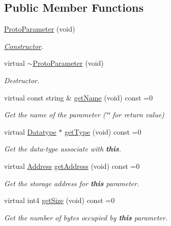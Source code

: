 \subsection*{Public Member Functions}
\begin{DoxyCompactItemize}
\item 
\mbox{\hyperlink{class_proto_parameter_a60a3aefc8f1ddf935990d4c9e6cc1367}{Proto\+Parameter}} (void)
\begin{DoxyCompactList}\small\item\em \mbox{\hyperlink{class_constructor}{Constructor}}. \end{DoxyCompactList}\item 
virtual \mbox{\hyperlink{class_proto_parameter_a63533cc17e94e8b022414ca5b03a101e}{$\sim$\+Proto\+Parameter}} (void)
\begin{DoxyCompactList}\small\item\em Destructor. \end{DoxyCompactList}\item 
virtual const string \& \mbox{\hyperlink{class_proto_parameter_a03d8c36596d1564b5366295ff63fc182}{get\+Name}} (void) const =0
\begin{DoxyCompactList}\small\item\em Get the name of the parameter (\char`\"{}\char`\"{} for return value) \end{DoxyCompactList}\item 
virtual \mbox{\hyperlink{class_datatype}{Datatype}} $\ast$ \mbox{\hyperlink{class_proto_parameter_a05bfe5b4fe563c1e4e93bf2648239061}{get\+Type}} (void) const =0
\begin{DoxyCompactList}\small\item\em Get the data-\/type associate with {\bfseries{this}}. \end{DoxyCompactList}\item 
virtual \mbox{\hyperlink{class_address}{Address}} \mbox{\hyperlink{class_proto_parameter_a33c604ed7e06ae0ca6ac491b46739343}{get\+Address}} (void) const =0
\begin{DoxyCompactList}\small\item\em Get the storage address for {\bfseries{this}} parameter. \end{DoxyCompactList}\item 
virtual int4 \mbox{\hyperlink{class_proto_parameter_a910cfb9ed6ce57e9bf6e9789b8ed3e0f}{get\+Size}} (void) const =0
\begin{DoxyCompactList}\small\item\em Get the number of bytes occupied by {\bfseries{this}} parameter. \end{DoxyCompactList}\item 

\end{DoxyCompactItemize}
